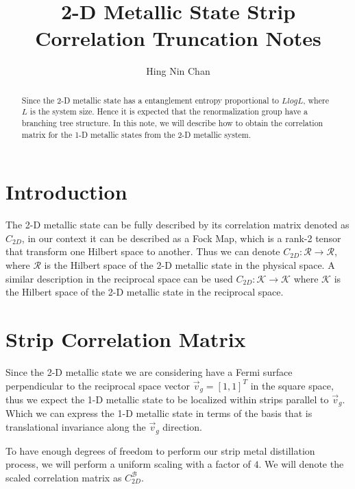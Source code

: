 \documentclass[%
    reprint,
    amsmath,amssymb,
    aps,
    floatfix,
]{revtex4-2}
\theoremstyle{plain}
\begin{document}
\title{2-D Metallic State Strip Correlation Truncation Notes}

\author{Hing Nin Chan}

\begin{abstract}
    Since the 2-D metallic state has a entanglement entropy proportional to $L log L$, where $L$ is the system
    size. Hence it is expected that the renormalization group have a branching tree structure. In this note, we 
    will describe how to obtain the correlation matrix for the 1-D metallic states from the 2-D metallic system.
\end{abstract}

\maketitle

\section{Introduction}
The 2-D metallic state can be fully described by its correlation matrix denoted as $C_{2D}$, in our context it can 
be described as a Fock Map, which is a rank-2 tensor that transform one Hilbert space to another. Thus we can denote 
$C_{2D}: \mathcal{R} \rightarrow \mathcal{R}$, where $\mathcal{R}$ is the Hilbert space of the 2-D metallic state in 
the physical space. A similar description in the reciprocal space can be used $C_{2D}: \mathcal{K} \rightarrow \mathcal{K}$ 
where $\mathcal{K}$ is the Hilbert space of the 2-D metallic state in the reciprocal space.

\section{Strip Correlation Matrix}
Since the 2-D metallic state we are considering have a Fermi surface perpendicular to the reciprocal space vector 
$\vec{v}_{g} = [1,1]^T$ in the square space, thus we expect the 1-D metallic state to be localized within strips parallel 
to $\vec{v}_{g}$. Which we can express the 1-D metallic state in terms of the basis that is translational invariance along 
the $\vec{v}_{g}$ direction.

\newcommand\blockedcorrelations{C_{2D}^{\mathcal{B}}}

To have enough degrees of freedom to perform our strip metal distillation process, we will perform a uniform scaling with a factor 
of $4$. We will denote the scaled correlation matrix as $\blockedcorrelations$.
\end{document}
